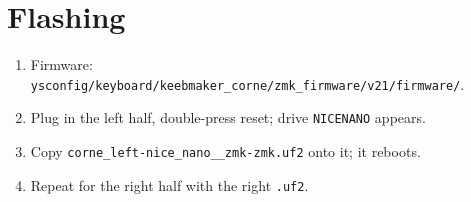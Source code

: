 \documentclass[11pt, letterpaper]{article}
\begin{document}
\section{Flashing}

\begin{enumerate}
  \item Firmware: \texttt{ysconfig/keyboard/keebmaker\_corne/zmk\_firmware/v21/firmware/}.
  \item Plug in the left half, double-press reset; drive \texttt{NICENANO} appears.
  \item Copy \texttt{corne\_left-nice\_nano\_\_zmk-zmk.uf2} onto it; it reboots.
  \item Repeat for the right half with the right \texttt{.uf2}.
\end{enumerate}
\end{document}
